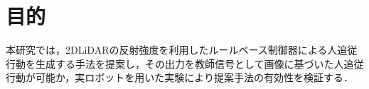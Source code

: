 
\section{目的}

  本研究では，2DLiDARの反射強度を利用したルールベース制御器による人追従行動を生成する手法を提案し，その出力を教師信号として画像に基づいた人追従行動が可能か，実ロボットを用いた実験により提案手法の有効性を検証する．

\newpage
